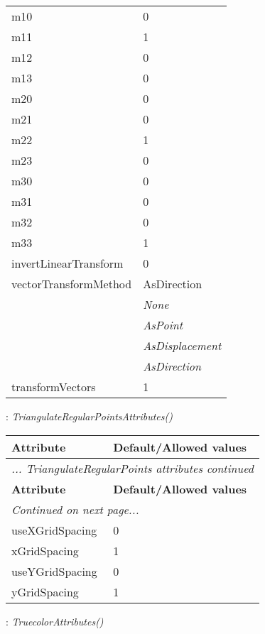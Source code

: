 \documentclass[10pt,a4paper]{report}
\begin{document}
\begin{longtable}{ll}
m10  &  0 \\
m11  &  1 \\
m12  &  0 \\
m13  &  0 \\
m20  &  0 \\
m21  &  0 \\
m22  &  1 \\
m23  &  0 \\
m30  &  0 \\
m31  &  0 \\
m32  &  0 \\
m33  &  1 \\
invertLinearTransform  &  0 \\
vectorTransformMethod  &  AsDirection   \\
 & {\it  None} \\
 & {\it  AsPoint} \\
 & {\it  AsDisplacement} \\
 & {\it  AsDirection} \\
transformVectors  &  1 \\
\end{longtable}

\newpage

{}
: {\it TriangulateRegularPointsAttributes() }\\[-3mm]

\begin{longtable}{ll}
{\bf Attribute} & {\bf Default/Allowed values} \\
\hline \hline
\endfirsthead
\multicolumn{2}{l}{{\it ... TriangulateRegularPoints attributes continued}} \\
{\bf Attribute} & {\bf Default/Allowed values} \\
\hline \hline
\endhead
\hline
\multicolumn{2}{l}{{\it Continued on next page...}} \\
\endfoot
\hline
\endlastfoot

useXGridSpacing  &  0 \\
xGridSpacing  &  1 \\
useYGridSpacing  &  0 \\
yGridSpacing  &  1 \\
\end{longtable}

\newpage

{}
: {\it TruecolorAttributes() }\\[-3mm]
\end{document}

